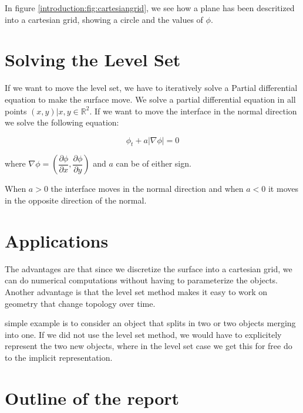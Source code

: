 In figure \vref{introduction:fig:cartesiangrid}, we see how a plane
has been descritized into a cartesian grid, showing a circle and the
values of $\phi$.


\section*{Solving the Level Set}\label{sec:intro:solve} 


If we want to move the level set, we have to iteratively solve a Partial
differential equation to make the surface move. We solve a partial
differential equation in all points $(x,y) | x,y \in
\mathbb{R}^{2}$. If we want to move the interface in the normal
direction we solve the following equation:

\begin{equation}
\phi_{t} + a|\nabla \phi| = 0
\end{equation}\label{eq:normMove}

where $\nabla \phi = (\dfrac{\partial \phi}{\partial x},
\dfrac{\partial \phi}{\partial y})$ and $a$ can be of either sign.

When $a > 0$ the interface moves in the normal direction and when $a <
0$ it moves in the opposite direction of the normal.


\section*{Applications}

The advantages are that since we discretize the surface into a
cartesian grid, we can do numerical computations without having to
parameterize the objects. Another advantage is that the level set
method makes it easy to work on geometry that change topology over
time.


simple example is to consider an object that splits in two or two
objects merging into one. If we did not use the level set method, we
would have to explicitely represent the two new objects, where in the
level set case we get this for free do to the implicit representation.


\newpage

\section*{Outline of the report}

